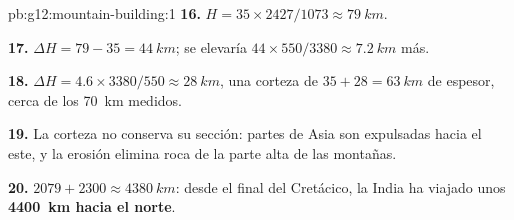 \begin{solution}{pb:g12:mountain-building:1}
\textbf{16.} $H = 35 \times 2427/1073 \approx \qty{79}{km}$.

\textbf{17.} $\Delta H = 79 - 35 = \qty{44}{km}$; se elevaría
$44 \times 550/3380 \approx \qty{7.2}{km}$ más.

\textbf{18.} $\Delta H = 4.6 \times 3380/550 \approx \qty{28}{km}$, una
corteza de $35 + 28 = \qty{63}{km}$ de espesor, cerca de los \qty{70}{km}
medidos.

\textbf{19.} La corteza no conserva su sección: partes de Asia son expulsadas
hacia el este, y la erosión elimina roca de la parte alta de las montañas.

\textbf{20.} $2079 + 2300 \approx \qty{4380}{km}$: desde el final del
Cretácico, la India ha viajado unos \textbf{\qty{4400}{km} hacia el norte}.
\end{solution}
